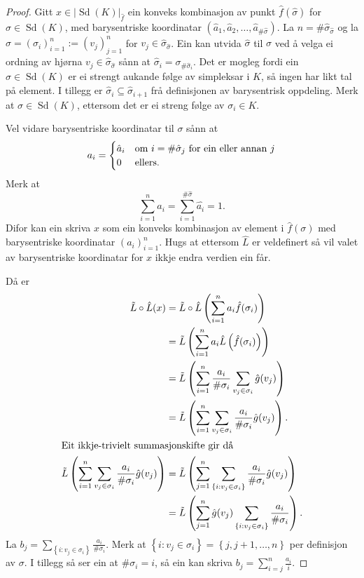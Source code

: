 \documentclass[a4paper, 12pt, norsk]{article}
\theoremstyle{plain}
\theoremstyle{definition}
\newcommand{\gr}[1]{ \lvert #1 \rvert } %
\newcommand{\set}[1]{ \left\{ #1 \right\} } %
\newcommand{\tuple}[1]{ \left( #1 \right) } %
\DeclareMathOperator{\Sd}{Sd} %
\begin{document}
\begin{proof}
	Gitt \( x \in \gr{\Sd(K)}_{\hat{f}} \) ein konveks kombinasjon av punkt \( \hat{f}(\hat{\sigma}) \) for \( \hat{\sigma} \in \Sd(K) \), med barysentriske koordinatar \( \tuple{\hat{a}_1, \hat{a}_2, \dots, \hat{a}_{\#\hat{\sigma}}} \). La \( n = \#\hat{\sigma}_{\hat{\sigma}} \) og la \( \sigma = \tuple{\sigma_i}_{i=1}^{n} := \tuple{v_j}_{j=1}^{n} \) for \( v_j \in \hat{\sigma}_{\hat{\sigma}} \). Ein kan utvida \( \hat{\sigma} \) til \( \sigma \) ved å velga ei ordning av hjørna \( v_j \in \hat{\sigma}_{\hat{\sigma}} \) sånn at \( \hat{\sigma}_i = \sigma_{\#\hat{\sigma}_i} \). Det er mogleg fordi ein \( \hat{\sigma} \in \Sd(K) \) er ei strengt aukande følge av simpleksar i \( K \), så ingen har likt tal på element. I tillegg er \( \hat{\sigma}_i \subseteq \hat{\sigma}_{i+1} \) frå definisjonen av barysentrisk oppdeling. Merk at \( \sigma \in \Sd(K) \), ettersom det er ei streng følge av \( \sigma_i \in K \).

	Vel vidare barysentriske koordinatar til \( \sigma \) sånn at
	\[
		a_i =
		\begin{cases}
			\hat{a}_i & \text{om \( i = \#\hat{\sigma}_j \) for ein eller annan \( j \)} \\
			0 & \text{ellers}.
		\end{cases}
	\]
	Merk at
	\[
		\sum_{i=1}^n a_i = \sum_{i=1}^{\#\hat{\sigma}}\hat{a_i}=1.
	\]
	Difor kan ein skriva \( x \) som ein konveks kombinasjon av element i \( \hat{f}(\sigma) \) med barysentriske koordinatar \( \tuple{a_i}_{i=1}^n \). Hugs at ettersom \( \hat{L} \) er veldefinert så vil valet av barysentriske koordinatar for \( x \) ikkje endra verdien ein får.

	Då er
	\begin{align*}
		\tilde{L}\circ\hat{L}(x) &= \tilde{L}\circ\hat{L}\tuple{\sum_{i=1}^n a_i \hat{f}(\sigma_i)} \\
		&= \tilde{L}\tuple{\sum_{i=1}^n a_i \hat{L}\tuple{\hat{f}(\sigma_i)}} \\
		&= \tilde{L}\tuple{\sum_{i=1}^n \frac{a_i}{\#\sigma_i}\sum_{v_j \in \sigma_i}\hat{g}(v_j)} \\
		&= \tilde{L}\tuple{\sum_{i=1}^n\sum_{v_j \in \sigma_i}\frac{a_i}{\#\sigma_i}\hat{g}(v_j)}. \\
		\intertext{Eit ikkje-trivielt summasjonskifte gir då}
		\tilde{L}\tuple{\sum_{i=1}^n\sum_{v_j \in \sigma_i}\frac{a_i}{\#\sigma_i}\hat{g}(v_j)} &= \tilde{L}\tuple{\sum_{j=1}^n\sum_{\set{i:v_j\in\sigma_i}}\frac{a_i}{\#\sigma_i}\hat{g}(v_j)} \\
		&= \tilde{L}\tuple{\sum_{j=1}^n \hat{g}(v_j) \sum_{\set{i:v_j\in\sigma_i}}\frac{a_i}{\#\sigma_i}}.
	\end{align*}
	La \( b_j = \sum_{\set{i:v_j\in\sigma_i}}\frac{a_i}{\#\sigma_i} \). Merk at \( \set{i : v_j \in \sigma_i} = \set{j, j+1, \dots, n } \) per definisjon av \( \sigma \). I tillegg så ser ein at \( \#\sigma_i = i \), så ein kan skriva \( b_j = \sum_{i=j}^n \frac{a_i}{i} \).


\end{proof}
\end{document}
